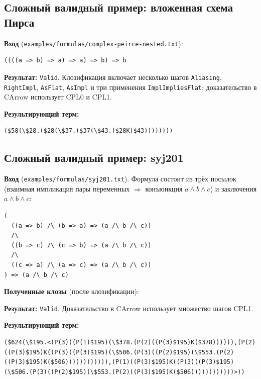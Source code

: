 \documentclass[a4paper,12pt]{article}
\newenvironment{listingcenter}{%
  \begin{center}\begin{minipage}{\linewidth}%
}{%
  \end{minipage}\end{center}%
}
\newcommand{\hssnippet}[2]{%
  \begin{listingcenter}%
  \end{listingcenter}}
\begin{document}
\subsection{Сложный валидный пример: вложенная схема Пирса}

\textbf{Вход} (\verb|examples/formulas/complex-peirce-nested.txt|):
\begin{lstlisting}[style=formula,caption={Вложенная схема Пирса},label={lst:ex-peirce-nested}]
((((a => b) => a) => a) => b) => b
\end{lstlisting}

\textbf{Результат:} \texttt{Valid}. Клозификация включает несколько шагов
\texttt{Aliasing}, \texttt{RightImpl}, \texttt{AsFlat}, \texttt{AsImpl} и три
применения \texttt{ImplImpliesFlat}; доказательство в CArrow использует CPL0 и CPL1.

\textbf{Результирующий терм:}
\begin{lstlisting}[caption={Редуцированный $\lambda$-терм для вложенной схемы Пирса},label={lst:ex-peirce-nested-term}]
($58(\$28.($28(\$37.($37(\$43.($28K($43))))))))
\end{lstlisting}

\subsection{Сложный валидный пример: syj201}

\textbf{Вход} (\verb|examples/formulas/syj201.txt|). Формула состоит из трёх
посылок (взаимная импликация пары переменных $\Rightarrow$ конъюнкция $a \land b \land c$)
и заключения $a \land b \land c$:
\begin{lstlisting}[style=formula,breaklines=true,caption={Формула syj201 (разбита по строкам)},label={lst:ex-syj201}]
(
  ((a => b) /\ (b => a) => (a /\ b /\ c))
  /\
  ((b => c) /\ (c => b) => (a /\ b /\ c))
  /\
  ((c => a) /\ (a => c) => (a /\ b /\ c))
) => (a /\ b /\ c)
\end{lstlisting}

\textbf{Полученные клозы} (после клозификации):
\hssnippet{syj201-clauses.txt}{Итоговые клозы для syj201}

\textbf{Результат:} \texttt{Valid}. Доказательство в CArrow использует множество
шагов CPL1.

\textbf{Результирующий терм:}
\begin{lstlisting}[breaklines=true,caption={Редуцированный $\lambda$-терм для syj201},label={lst:ex-syj201-term}]
($624(\$195.<(P(3)((P(1)$195)(\$378.(P(2)((P(3)$195)K($378)))))),(P(2)((P(3)$195)K((P(3)((P(3)$195)(\$506.(P(3)((P(2)$195)(\$553.(P(2)((P(3)$195)K($506)))))))))))),(P(1)((P(3)$195)K((P(3)((P(3)$195)(\$506.(P(3)((P(2)$195)(\$553.(P(2)((P(3)$195)K($506))))))))))))>))
\end{lstlisting}
\end{document}
